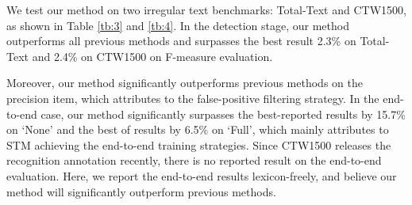 \documentclass[letterpaper]{article} \usepackage{aaai20}  \usepackage{times}  \usepackage{helvet} \usepackage{courier}  \usepackage[hyphens]{url}  \usepackage{graphicx} \urlstyle{rm} \def\UrlFont{\rm}  \usepackage{graphicx}  \frenchspacing  \setlength{\pdfpagewidth}{8.5in}  \setlength{\pdfpageheight}{11in}  \usepackage{amsmath}
\begin{document}
\begin{table}[ht]
\centering
{}
\caption{Result on Total-Text. ``Full'' indicates lexicons of all images are combined. ``None'' means lexicon-free.}
\label{tb:3}
\end{table}

We test our method on two irregular text benchmarks: Total-Text and CTW1500, as shown in Table \ref{tb:3} and \ref{tb:4}.
In the detection stage, our method outperforms all previous methods and surpasses the best result 2.3\% on Total-Text and 2.4\% on CTW1500 on F-measure evaluation.

Moreover, our method significantly outperforms previous methods on the precision item, which attributes to the false-positive filtering strategy.
In the end-to-end case, our method significantly surpasses the best-reported results \cite{sun2018textnet} by 15.7\% on `None' and the best of results \cite{lyu2018mask} by 6.5\% on `Full', which mainly attributes to STM achieving the end-to-end training strategies.
Since CTW1500 releases the recognition annotation recently, there is no reported result on the end-to-end evaluation. Here, we report the end-to-end results lexicon-freely, and believe our method will significantly outperform previous methods.
\end{document}
